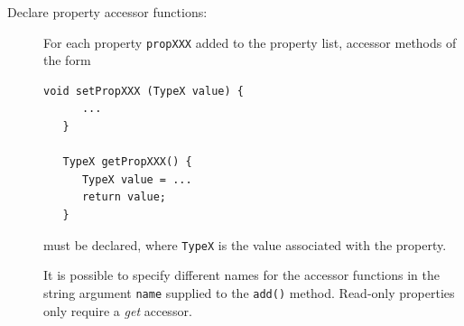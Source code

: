 \begin{description}
\item[Declare property accessor functions:]\mbox{}

For each property {\tt propXXX} added to the property list, accessor methods of
the form
%
\begin{lstlisting}[]
   void setPropXXX (TypeX value) {
      ...
   }

   TypeX getPropXXX() {
      TypeX value = ...
      return value;
   }
\end{lstlisting}
%
must be declared, where {\tt TypeX} is the value associated with the
property. 
\begin{sideblock}
It is possible to specify different names for the accessor functions
in the string argument {\tt name} supplied to the {\tt add()}
method. Read-only properties only require a {\it get} accessor.
\end{sideblock}

\end{description}


